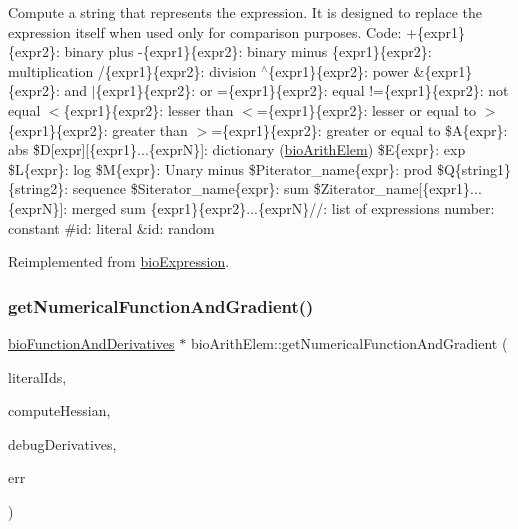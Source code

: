 Compute a string that represents the expression. It is designed to replace the expression itself when used only for comparison purposes. Code\+: +\{expr1\}\{expr2\}\+: binary plus -\/\{expr1\}\{expr2\}\+: binary minus \{expr1\}\{expr2\}\+: multiplication /\{expr1\}\{expr2\}\+: division $^\wedge$\{expr1\}\{expr2\}\+: power \&\{expr1\}\{expr2\}\+: and $\vert$\{expr1\}\{expr2\}\+: or =\{expr1\}\{expr2\}\+: equal !=\{expr1\}\{expr2\}\+: not equal $<$\{expr1\}\{expr2\}\+: lesser than $<$=\{expr1\}\{expr2\}\+: lesser or equal to $>$\{expr1\}\{expr2\}\+: greater than $>$=\{expr1\}\{expr2\}\+: greater or equal to \$A\{expr\}\+: abs \$D\mbox{[}expr\mbox{]}\mbox{[}\{expr1\}...\{exprN\}\mbox{]}\+: dictionary (\hyperlink{classbio_arith_elem}{bio\+Arith\+Elem}) \$E\{expr\}\+: exp \$L\{expr\}\+: log \$M\{expr\}\+: Unary minus \$\+Piterator\+\_\+name\{expr\}\+: prod \$Q\{string1\}\{string2\}\+: sequence \$\+Siterator\+\_\+name\{expr\}\+: sum \$\+Ziterator\+\_\+name\mbox{[}\{expr1\}...\{exprN\}\mbox{]}\+: merged sum \{expr1\}\{expr2\}...\{exprN\}//\+: list of expressions number\+: constant \#id\+: literal \&id\+: random 

Reimplemented from \hyperlink{classbio_expression_a3e4b4dca58dbbc6f0e411b30eb3f60b4}{bio\+Expression}.

\mbox{\label{classbio_arith_elem_a3aa76152765b0c8acb778f2070ded9f8}} 
\subsubsection{\texorpdfstring{get\+Numerical\+Function\+And\+Gradient()}{getNumericalFunctionAndGradient()}}
{\footnotesize\ttfamily \hyperlink{classbio_function_and_derivatives}{bio\+Function\+And\+Derivatives} $\ast$ bio\+Arith\+Elem\+::get\+Numerical\+Function\+And\+Gradient (\begin{DoxyParamCaption}\item[{vector$<$ pat\+U\+Long $>$}]{literal\+Ids,  }\item[{pat\+Boolean}]{compute\+Hessian,  }\item[{pat\+Boolean}]{debug\+Derivatives,  }\item[{pat\+Error $\ast$\&}]{err }\end{DoxyParamCaption})\hspace{0.3cm}{\ttfamily [virtual]}}

